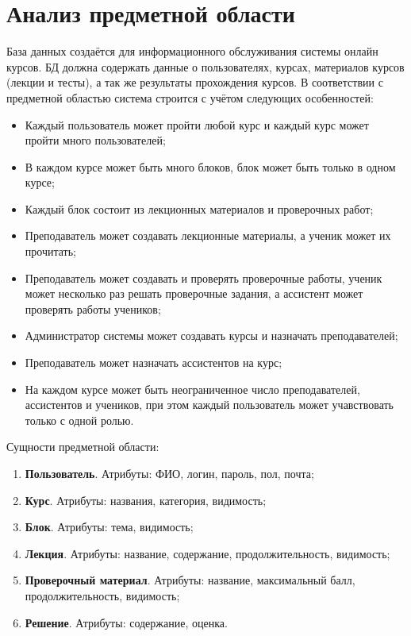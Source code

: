 \documentclass[a4paper,14pt]{article}
\begin{document}

\tableofcontents
\pagebreak

\section{Анализ предметной области}

База данных создаётся для информационного обслуживания системы онлайн курсов.
БД должна содержать данные о пользователях, курсах, материалов курсов (лекции и тесты), а так же результаты прохождения курсов.
В соответствии с предметной областью система строится с учётом следующих особенностей:

\begin{itemize}
	\item Каждый пользователь может пройти любой курс и каждый курс может пройти много пользователей;
	\item В каждом курсе может быть много блоков, блок может быть только в одном курсе;
	\item Каждый блок состоит из лекционных материалов и проверочных работ;
	\item Преподаватель может создавать лекционные материалы, а ученик может их прочитать;
	\item Преподаватель может создавать и проверять проверочные работы, ученик может несколько раз решать проверочные задания, а ассистент может проверять работы учеников;
	\item Администратор системы может создавать курсы и назначать преподавателей;
	\item Преподаватель может назначать ассистентов на курс;
	\item На каждом курсе может быть неограниченное число преподавателей, ассистентов и учеников, при этом каждый пользователь может учавствовать только с одной ролью.	
\end{itemize}

Сущности предметной области:

\begin{enumerate}
	\item \textbf{Пользователь}. Атрибуты: ФИО, логин, пароль, пол, почта;
	\item \textbf{Курс}. Атрибуты: названия, категория, видимость;
	\item \textbf{Блок}. Атрибуты: тема, видимость;
	\item \textbf{Лекция}. Атрибуты: название, содержание, продолжительность, видимость;
	\item \textbf{Проверочный материал}. Атрибуты: название, максимальный балл, продолжительность, видимость;
	\item \textbf{Решение}. Атрибуты: содержание, оценка.
\end{enumerate}
\end{document}
